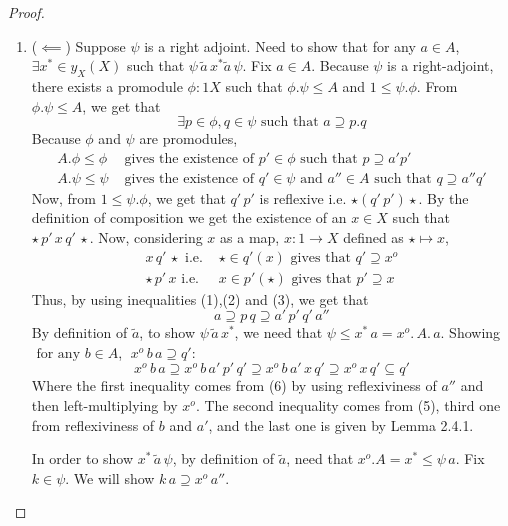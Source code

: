 \documentclass[18pt,a4paper]{article}
\makeatletter
\theoremstyle{definition}
\newcommand{\carrow}{}%
\DeclareRobustCommand{\carrow}{%
	\mathrel{\vphantom{\rightarrow}\mathpalette\circle@arrow\relax}%
}
\newcommand{\circle@arrow}[2]{%
	\m@th
	\ooalign{%
		\hidewidth$#1\circ\mkern1mu$\hidewidth\cr
	$#1\longrightarrow$\cr}%
}
\makeatother
\begin{document}
\begin{proof}
\begin{enumerate}[label=(\roman*)]
			\item ($\impliedby$) Suppose $\psi$ is a right adjoint. Need to show that for any
				$a \in A$, $\exists x^* \in y_X(X)$ such that $\psi \, \tilde{a} \,x^*
				\tilde{a} \, \psi$. Fix $a \in A$. Because $\psi$ is a right-adjoint, there
				exists a promodule $\phi: 1 \carrow X$ such that $\phi.\psi \leq A$ and
				$1\leq \psi.\phi$. From $\phi.\psi \leq A$, we get that
				\begin{equation}\exists p \in \phi, q \in \psi \text{ such that }
					a \supseteq p.q
				\end{equation}
				Because $\phi$ and $\psi$ are promodules,
				\begin{align}
					A.\phi \leq \phi & \text{ gives the existence of } p' \in \phi \text{ such that } p\supseteq a'p'  \\
					A.\psi \leq \psi & \text{ gives the existence of } q' \in \psi \text{ and } a'' \in A
					\text{ such that } q \supseteq a''q'
				\end{align}
				Now, from $1 \leq \psi.\phi$, we get that $q'\,p'$ is reflexive i.e. $\star (q' \,p')
				\star$. By the definition of composition we get the existence of an $x \in X$
				such that $\star \, p' \, x \,q'\,\star$. Now, considering $x$ as a map, $x:1 \to X$
				defined as $\star \mapsto x$,
				\begin{align}
					x \, q' \, \star \text{ i.e. } &\star \in q'(x) \text{ gives that }
					q' \supseteq x^o \\
					\star \,p' \, x \text{ i.e. } &x \in p'(\star) \text{ gives that }
					p'\supseteq x
				\end{align}
				Thus, by using inequalities (1),(2) and (3), we get that
				\begin{equation}
					a \supseteq p\,q \supseteq a'\,p'\,q'\,a''
				\end{equation}
				By definition of $\tilde{a}$, to show $\psi \, \tilde{a} \, x^*$,
				we need that $\psi \leq x^*\,a=x^o.\,A.\,a$. Showing
				$\text{ for any } b\in A$, $\;  x^o\,b\,a \supseteq q'$:
				\[ x^o\,b\,a \supseteq x^o\,b\,a'\,p'\,q' \supseteq x^o\,b\,a'\,x\,q'
				\supseteq x^o\,x\,q' \subseteq q'\]
				Where the first inequality comes from (6) by using reflexiviness of $a''$ and then
				left-multiplying by $x^o$. The second inequality comes from (5),
				third one from reflexiviness of $b$ and $a'$,
				and the last one is given by Lemma 2.4.1.

				In order to show $x^* \, \tilde{a} \, \psi$, by definition of $\tilde{a}$,
				need that $x^o.A=x^* \leq \psi\,a$. Fix $k\in \psi$. We will show
				$k\,a \supseteq x^o \, a''$.


\end{enumerate}
\end{proof}
\end{document}
